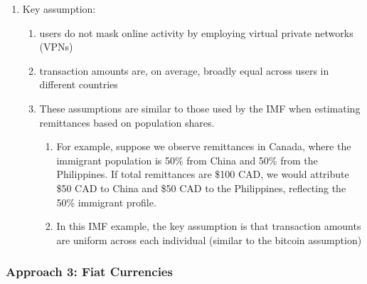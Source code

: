 \documentclass[
  11pt,
]{article}
\providecommand{\tightlist}{%
  \setlength{\itemsep}{0pt}\setlength{\parskip}{0pt}}\usepackage{longtable,booktabs,array}
\begin{document}
\begin{enumerate}
\def\labelenumi{\arabic{enumi}.}
\setcounter{enumi}{3}
\tightlist
\item
  Key assumption:

  \begin{enumerate}
  \def\labelenumii{\arabic{enumii}.}
  \tightlist
  \item
    users do not mask online activity by employing virtual private
    networks (VPNs)
  \item
    transaction amounts are, on average, broadly equal across users in
    different countries
  \item
    These assumptions are similar to those used by the IMF when
    estimating remittances based on population shares.

    \begin{enumerate}
    \def\labelenumiii{\arabic{enumiii}.}
    \tightlist
    \item
      For example, suppose we observe remittances in Canada, where the
      immigrant population is 50\% from China and 50\% from the
      Philippines. If total remittances are \$100 CAD, we would
      attribute \$50 CAD to China and \$50 CAD to the Philippines,
      reflecting the 50\% immigrant profile.
    \item
      In this IMF example, the key assumption is that transaction
      amounts are uniform across each individual (similar to the bitcoin
      assumption)
    \end{enumerate}
  \end{enumerate}
\end{enumerate}

\subsubsection{Approach 3: Fiat
Currencies}\label{approach-3-fiat-currencies}
\end{document}
